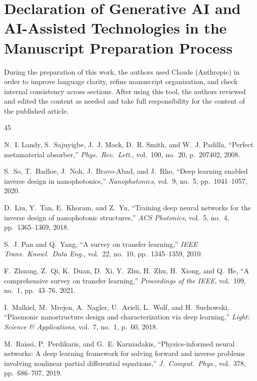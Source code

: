 \documentclass[a4paper,fleqn]{cas-sc}
\begin{document}
\section*{Declaration of Generative AI and AI-Assisted Technologies in the Manuscript Preparation Process}

During the preparation of this work, the authors used Claude (Anthropic) in order to improve language clarity, refine manuscript organization, and check internal consistency across sections. After using this tool, the authors reviewed and edited the content as needed and take full responsibility for the content of the published article.

\begin{thebibliography}{45}

N.~I. Landy, S.~Sajuyigbe, J.~J. Mock, D.~R. Smith, and W.~J. Padilla, ``Perfect metamaterial absorber,'' \textit{Phys.~Rev.~Lett.}, vol.~100, no.~20, p.~207402, 2008.

S.~So, T.~Badloe, J.~Noh, J.~Bravo-Abad, and J.~Rho, ``Deep learning enabled inverse design in nanophotonics,'' \textit{Nanophotonics}, vol.~9, no.~5, pp.~1041--1057, 2020.

D.~Liu, Y.~Tan, E.~Khoram, and Z.~Yu, ``Training deep neural networks for the inverse design of nanophotonic structures,'' \textit{ACS Photonics}, vol.~5, no.~4, pp.~1365--1369, 2018.

S.~J. Pan and Q.~Yang, ``A survey on transfer learning,'' \textit{IEEE Trans.~Knowl.~Data Eng.}, vol.~22, no.~10, pp.~1345--1359, 2010.

F.~Zhuang, Z.~Qi, K.~Duan, D.~Xi, Y.~Zhu, H.~Zhu, H.~Xiong, and Q.~He, ``A comprehensive survey on transfer learning,'' \textit{Proceedings of the IEEE}, vol.~109, no.~1, pp.~43--76, 2021.

I.~Malkiel, M.~Mrejen, A.~Nagler, U.~Arieli, L.~Wolf, and H.~Suchowski, ``Plasmonic nanostructure design and characterization via deep learning,'' \textit{Light: Science \& Applications}, vol.~7, no.~1, p.~60, 2018.

M.~Raissi, P.~Perdikaris, and G.~E. Karniadakis, ``Physics-informed neural networks: A deep learning framework for solving forward and inverse problems involving nonlinear partial differential equations,'' \textit{J.~Comput.~Phys.}, vol.~378, pp.~686--707, 2019.


\end{thebibliography}
\end{document}
